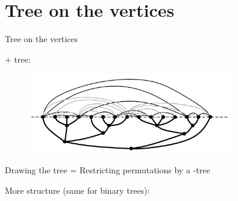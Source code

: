 \section{Tree on the vertices}

\begin{frame}{Tree on the vertices}

\probBook + tree:

\begin{overprint}
\begin{figure}\centering
\includegraphics[width=0.8\textwidth]{sefe2}
\end{figure}

Drawing the tree = Restricting permutations by a \PT-tree

\vspace{-1em}

More structure (same for binary trees):
\end{overprint}
\end{frame}

